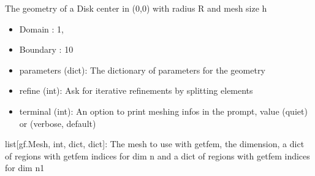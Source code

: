 \documentclass[letterpaper,10pt,english]{sphinxmanual}
\begin{document}

\begin{fulllineitems}
\label{\detokenize{scrimp.utils:scrimp.utils.mesh.Disk}}
\pysigstartsignatures
\pysiglinewithargsret
{}
{\sphinxparamcomma {}\sphinxparamcomma {}\sphinxparamcomma {}}
{}
\pysigstopsignatures
\sphinxAtStartPar
The geometry of a Disk center in (0,0) with radius R and mesh size h
\begin{itemize}
\item {} 
\sphinxAtStartPar
Domain : 1,

\item {} 
\sphinxAtStartPar
Boundary : 10

\end{itemize}
\begin{description}
\begin{itemize}
\item {} 
\sphinxAtStartPar
parameters (dict): The dictionary of parameters for the geometry

\item {} 
\sphinxAtStartPar
refine (int): Ask for iterative refinements by splitting elements

\item {} 
\sphinxAtStartPar
terminal (int): An option to print meshing infos in the prompt, value  (quiet) or  (verbose, default)

\end{itemize}

\sphinxAtStartPar
list{[}gf.Mesh, int, dict, dict{]}: The mesh to use with getfem, the dimension, a dict of regions with getfem indices for dim n and a dict of regions with getfem indices for dim n\sphinxhyphen{}1

\end{description}

\end{fulllineitems}
\end{document}
